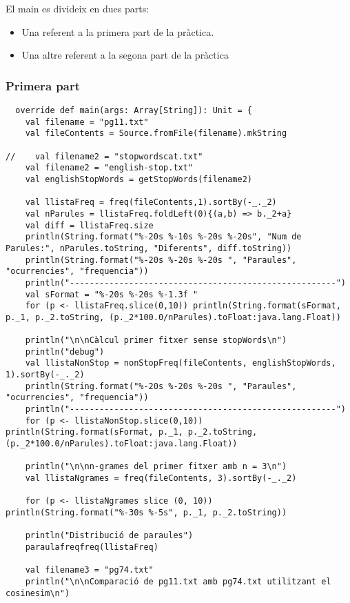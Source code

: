 \documentclass[11pt,a4paper,twoside]{report}
\begin{document}
El main es divideix en dues parts:
\begin{itemize}
  \item Una referent a la primera part de la pràctica.
  \item Una altre referent a la segona part de la pràctica
\end{itemize}

\subsubsection{Primera part}

\begin{lstlisting}
  override def main(args: Array[String]): Unit = {
    val filename = "pg11.txt"
    val fileContents = Source.fromFile(filename).mkString

//    val filename2 = "stopwordscat.txt"
    val filename2 = "english-stop.txt"
    val englishStopWords = getStopWords(filename2)

    val llistaFreq = freq(fileContents,1).sortBy(-_._2)
    val nParules = llistaFreq.foldLeft(0){(a,b) => b._2+a}
    val diff = llistaFreq.size
    println(String.format("%-20s %-10s %-20s %-20s", "Num de Parules:", nParules.toString, "Diferents", diff.toString))
    println(String.format("%-20s %-20s %-20s ", "Paraules", "ocurrencies", "frequencia"))
    println("------------------------------------------------------")
    val sFormat = "%-20s %-20s %-1.3f "
    for (p <- llistaFreq.slice(0,10)) println(String.format(sFormat, p._1, p._2.toString, (p._2*100.0/nParules).toFloat:java.lang.Float))

    println("\n\nCàlcul primer fitxer sense stopWords\n")
    println("debug")
    val llistaNonStop = nonStopFreq(fileContents, englishStopWords, 1).sortBy(-_._2)
    println(String.format("%-20s %-20s %-20s ", "Paraules", "ocurrencies", "frequencia"))
    println("------------------------------------------------------")
    for (p <- llistaNonStop.slice(0,10)) println(String.format(sFormat, p._1, p._2.toString, (p._2*100.0/nParules).toFloat:java.lang.Float))

    println("\n\nn-grames del primer fitxer amb n = 3\n")
    val llistaNgrames = freq(fileContents, 3).sortBy(-_._2)

    for (p <- llistaNgrames slice (0, 10)) println(String.format("%-30s %-5s", p._1, p._2.toString))

    println("Distribució de paraules")
    paraulafreqfreq(llistaFreq)

    val filename3 = "pg74.txt"
    println("\n\nComparació de pg11.txt amb pg74.txt utilitzant el cosinesim\n")


\end{lstlisting}
\end{document}
